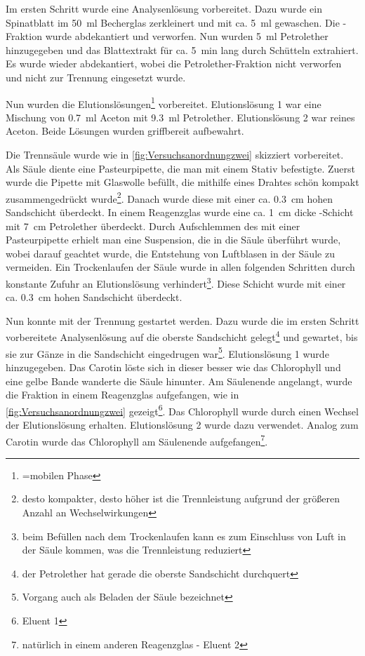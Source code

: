\documentclass{article}
\begin{document}
        Im ersten Schritt wurde eine Analysenlösung vorbereitet. Dazu wurde ein Spinatblatt im \SI[mode=text,separate-uncertainty=true]{50}{\milli\litre} Becherglas zerkleinert und mit ca. \SI[mode=text]{5}{\milli\litre}  gewaschen. Die -Fraktion wurde abdekantiert und verworfen. Nun wurden \SI[mode=text]{5}{\milli\litre} Petrolether hinzugegeben und das Blattextrakt für ca. \SI[mode=text]{5}{\minute} lang durch Schütteln extrahiert. Es wurde wieder abdekantiert, wobei die Petrolether-Fraktion nicht verworfen und nicht zur Trennung eingesetzt wurde. 
        
        Nun wurden die Elutionslösungen\footnote{=mobilen Phase} vorbereitet. Elutionslösung 1 war eine Mischung von \SI[mode=text]{0.7}{\milli\litre} Aceton mit \SI[mode=text]{9.3}{\milli\litre} Petrolether. Elutionslösung 2 war reines Aceton. Beide Lösungen wurden griffbereit aufbewahrt.
        
        Die Trennsäule wurde wie in \ref{fig:Versuchsanordnungzwei} skizziert vorbereitet. Als Säule diente eine Pasteurpipette, die man mit einem Stativ befestigte. Zuerst wurde die Pipette mit Glaswolle befüllt, die mithilfe eines Drahtes schön kompakt zusammengedrückt wurde\footnote{desto kompakter, desto höher ist die Trennleistung aufgrund der größeren Anzahl an Wechselwirkungen}. Danach wurde diese mit einer ca. \SI[mode=text]{0.3}{\centi\meter} hohen Sandschicht überdeckt. In einem Reagenzglas wurde eine ca. \SI[mode=text]{1}{\centi\meter} dicke -Schicht mit \SI[mode=text]{7}{\centi\meter} Petrolether überdeckt. Durch Aufschlemmen des  mit einer Pasteurpipette  erhielt man eine Suspension, die in die Säule überführt wurde, wobei darauf geachtet wurde, die Entstehung von Luftblasen in der Säule zu vermeiden. Ein Trockenlaufen der Säule wurde in allen folgenden Schritten durch konstante Zufuhr an Elutionslösung verhindert\footnote{beim Befüllen nach dem Trockenlaufen kann es zum Einschluss von Luft in der Säule kommen, was die Trennleistung reduziert}. Diese Schicht wurde mit einer ca. \SI[mode=text]{0.3}{\centi\meter} hohen Sandschicht überdeckt. 
        
        Nun konnte mit der Trennung gestartet werden. Dazu wurde die im ersten Schritt vorbereitete Analysenlösung auf die oberste Sandschicht gelegt\footnote{der Petrolether hat gerade die oberste Sandschicht durchquert} und gewartet, bis sie zur Gänze in die Sandschicht eingedrugen war\footnote{Vorgang auch als Beladen der Säule bezeichnet}. Elutionslösung 1 wurde hinzugegeben. Das Carotin löste sich in dieser besser wie das Chlorophyll und eine gelbe Bande wanderte die Säule hinunter. Am Säulenende angelangt, wurde die Fraktion in einem Reagenzglas aufgefangen, wie in \ref{fig:Versuchsanordnungzwei} gezeigt\footnote{Eluent 1}. Das Chlorophyll wurde durch einen Wechsel der Elutionslösung erhalten. Elutionslösung 2 wurde dazu verwendet. Analog zum Carotin wurde das Chlorophyll am Säulenende aufgefangen\footnote{natürlich in einem anderen Reagenzglas - Eluent 2}.
        
\end{document}
